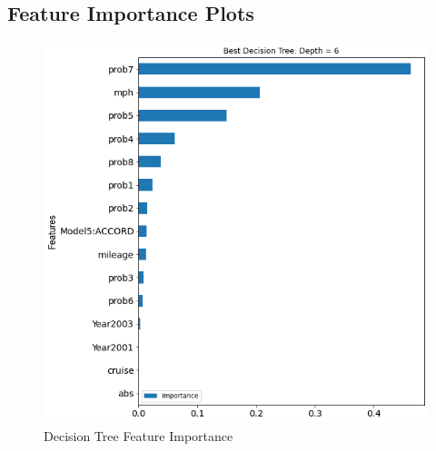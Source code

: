 \documentclass[12pt]{article}
\begin{document}
\subsection{Feature Importance Plots}
\begin{figure}[H]
	\begin{center}
	\includegraphics[width=\textwidth, keepaspectratio, angle=0]{DT_FeatureImp.png}
	\caption{Decision Tree Feature Importance}
	\label{fig:DT_FeatureImp}
	\end{center}
\end{figure}
\end{document}
